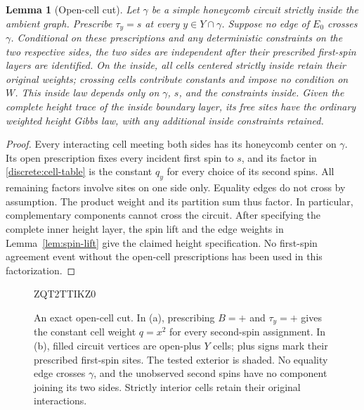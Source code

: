 \documentclass[11pt]{article}
\newtheorem{lemma}[theorem]{Lemma}
\theoremstyle{definition}
\theoremstyle{remark}
\numberwithin{equation}{section}
\begin{document}
\begin{samepage}
\begin{lemma}[Open-cell cut]\label{lem:cell-cut}
Let $\gamma$ be a simple honeycomb circuit strictly inside the ambient graph.
Prescribe $\tau_y=s$ at every $y\in Y\cap\gamma$. Suppose no edge of $E_0$
crosses $\gamma$. Conditional on these prescriptions and any deterministic
constraints on the two respective sides, the two sides are independent
after their prescribed first-spin layers are identified. On the inside,
all cells centered strictly inside retain their original weights; crossing
cells contribute constants and impose no condition on $W$. This inside law
depends only on $\gamma$, $s$, and the constraints inside. Given the complete
height trace of the inside boundary layer, its free sites have the ordinary
weighted height Gibbs law, with any additional inside constraints retained.
\end{lemma}
\end{samepage}
\begin{proof}
Every interacting cell meeting both sides has its honeycomb center on
$\gamma$. Its open prescription fixes every incident first spin to $s$,
and its factor in \eqref{discrete:cell-table} is the constant $q_y$ for
every choice of its second spins. All remaining factors involve sites on
one side only. Equality edges do not cross by assumption. The product
weight and its partition sum thus factor. In particular, complementary
components cannot cross the circuit. After specifying the complete inner
height layer, the spin lift and the edge weights in
Lemma~\ref{lem:spin-lift} give the claimed height specification. No
first-spin agreement event without the open-cell prescriptions has been
used in this factorization.
\end{proof}

\begin{figure}[tbp]
 
 ZQT2TTIKZ0

 \caption{An exact open-cell cut. In (a), prescribing $B=+$ and
 $\tau_y=+$ gives the constant cell weight $q=x^2$ for every second-spin
 assignment. In (b), filled circuit vertices are open-plus $Y$ cells;
 plus signs mark their prescribed first-spin sites. The tested exterior
 is shaded. No equality edge crosses $\gamma$, and the unobserved second
 spins have no component joining its two sides. Strictly interior cells
 retain their original interactions.}
 \label{discrete:fig-cut}
\end{figure}
\end{document}
